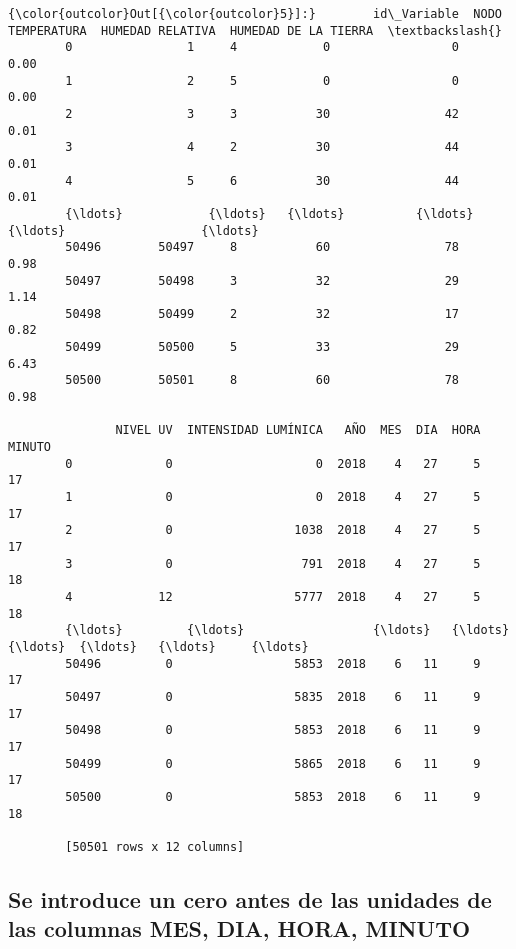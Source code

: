 \documentclass[11pt]{article}
\begin{document}
\begin{Verbatim}[commandchars=\\\{\}]
{\color{outcolor}Out[{\color{outcolor}5}]:}        id\_Variable  NODO  TEMPERATURA  HUMEDAD RELATIVA  HUMEDAD DE LA TIERRA  \textbackslash{}
        0                1     4            0                 0                  0.00   
        1                2     5            0                 0                  0.00   
        2                3     3           30                42                  0.01   
        3                4     2           30                44                  0.01   
        4                5     6           30                44                  0.01   
        {\ldots}            {\ldots}   {\ldots}          {\ldots}               {\ldots}                   {\ldots}   
        50496        50497     8           60                78                  0.98   
        50497        50498     3           32                29                  1.14   
        50498        50499     2           32                17                  0.82   
        50499        50500     5           33                29                  6.43   
        50500        50501     8           60                78                  0.98   
        
               NIVEL UV  INTENSIDAD LUMÍNICA   AÑO  MES  DIA  HORA  MINUTO  
        0             0                    0  2018    4   27     5      17  
        1             0                    0  2018    4   27     5      17  
        2             0                 1038  2018    4   27     5      17  
        3             0                  791  2018    4   27     5      18  
        4            12                 5777  2018    4   27     5      18  
        {\ldots}         {\ldots}                  {\ldots}   {\ldots}  {\ldots}  {\ldots}   {\ldots}     {\ldots}  
        50496         0                 5853  2018    6   11     9      17  
        50497         0                 5835  2018    6   11     9      17  
        50498         0                 5853  2018    6   11     9      17  
        50499         0                 5865  2018    6   11     9      17  
        50500         0                 5853  2018    6   11     9      18  
        
        [50501 rows x 12 columns]
\end{Verbatim}
            
    \subsection{Se introduce un cero antes de las unidades de las columnas
MES, DIA, HORA,
MINUTO}\label{se-introduce-un-cero-antes-de-las-unidades-de-las-columnas-mes-dia-hora-minuto}
\end{document}
